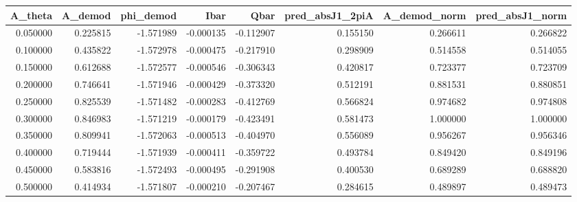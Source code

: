 \begin{tabular}{rrrrrrrr}
\toprule
A_theta & A_demod & phi_demod & Ibar & Qbar & pred_absJ1_2piA & A_demod_norm & pred_absJ1_norm \\
\midrule
0.050000 & 0.225815 & -1.571989 & -0.000135 & -0.112907 & 0.155150 & 0.266611 & 0.266822 \\
0.100000 & 0.435822 & -1.572978 & -0.000475 & -0.217910 & 0.298909 & 0.514558 & 0.514055 \\
0.150000 & 0.612688 & -1.572577 & -0.000546 & -0.306343 & 0.420817 & 0.723377 & 0.723709 \\
0.200000 & 0.746641 & -1.571946 & -0.000429 & -0.373320 & 0.512191 & 0.881531 & 0.880851 \\
0.250000 & 0.825539 & -1.571482 & -0.000283 & -0.412769 & 0.566824 & 0.974682 & 0.974808 \\
0.300000 & 0.846983 & -1.571219 & -0.000179 & -0.423491 & 0.581473 & 1.000000 & 1.000000 \\
0.350000 & 0.809941 & -1.572063 & -0.000513 & -0.404970 & 0.556089 & 0.956267 & 0.956346 \\
0.400000 & 0.719444 & -1.571939 & -0.000411 & -0.359722 & 0.493784 & 0.849420 & 0.849196 \\
0.450000 & 0.583816 & -1.572493 & -0.000495 & -0.291908 & 0.400530 & 0.689289 & 0.688820 \\
0.500000 & 0.414934 & -1.571807 & -0.000210 & -0.207467 & 0.284615 & 0.489897 & 0.489473 \\
\bottomrule
\end{tabular}
